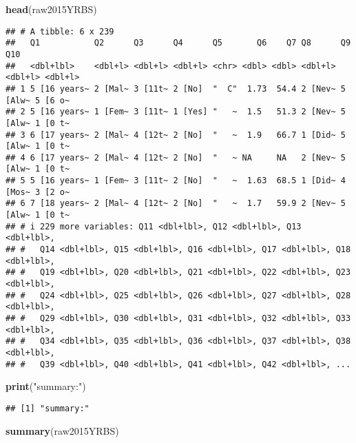 \documentclass[
]{article}
\newenvironment{Shaded}{\begin{snugshade}}{\end{snugshade}}
\newcommand{\FunctionTok}[1]{\textcolor[rgb]{0.13,0.29,0.53}{\textbf{#1}}}
\newcommand{\NormalTok}[1]{#1}
\newcommand{\StringTok}[1]{\textcolor[rgb]{0.31,0.60,0.02}{#1}}
\begin{document}
\begin{Shaded}
\begin{Highlighting}[]
\FunctionTok{head}\NormalTok{(raw2015YRBS)}
\end{Highlighting}
\end{Shaded}

\begin{verbatim}
## # A tibble: 6 x 239
##   Q1           Q2      Q3      Q4      Q5       Q6    Q7 Q8      Q9      Q10    
##   <dbl+lbl>    <dbl+l> <dbl+l> <dbl+l> <chr> <dbl> <dbl> <dbl+l> <dbl+l> <dbl+l>
## 1 5 [16 years~ 2 [Mal~ 3 [11t~ 2 [No]  "  C"  1.73  54.4 2 [Nev~ 5 [Alw~ 5 [6 o~
## 2 5 [16 years~ 1 [Fem~ 3 [11t~ 1 [Yes] "   ~  1.5   51.3 2 [Nev~ 5 [Alw~ 1 [0 t~
## 3 6 [17 years~ 2 [Mal~ 4 [12t~ 2 [No]  "   ~  1.9   66.7 1 [Did~ 5 [Alw~ 1 [0 t~
## 4 6 [17 years~ 2 [Mal~ 4 [12t~ 2 [No]  "   ~ NA     NA   2 [Nev~ 5 [Alw~ 1 [0 t~
## 5 5 [16 years~ 1 [Fem~ 3 [11t~ 2 [No]  "   ~  1.63  68.5 1 [Did~ 4 [Mos~ 3 [2 o~
## 6 7 [18 years~ 2 [Mal~ 4 [12t~ 2 [No]  "   ~  1.7   59.9 2 [Nev~ 5 [Alw~ 1 [0 t~
## # i 229 more variables: Q11 <dbl+lbl>, Q12 <dbl+lbl>, Q13 <dbl+lbl>,
## #   Q14 <dbl+lbl>, Q15 <dbl+lbl>, Q16 <dbl+lbl>, Q17 <dbl+lbl>, Q18 <dbl+lbl>,
## #   Q19 <dbl+lbl>, Q20 <dbl+lbl>, Q21 <dbl+lbl>, Q22 <dbl+lbl>, Q23 <dbl+lbl>,
## #   Q24 <dbl+lbl>, Q25 <dbl+lbl>, Q26 <dbl+lbl>, Q27 <dbl+lbl>, Q28 <dbl+lbl>,
## #   Q29 <dbl+lbl>, Q30 <dbl+lbl>, Q31 <dbl+lbl>, Q32 <dbl+lbl>, Q33 <dbl+lbl>,
## #   Q34 <dbl+lbl>, Q35 <dbl+lbl>, Q36 <dbl+lbl>, Q37 <dbl+lbl>, Q38 <dbl+lbl>,
## #   Q39 <dbl+lbl>, Q40 <dbl+lbl>, Q41 <dbl+lbl>, Q42 <dbl+lbl>, ...
\end{verbatim}

\begin{Shaded}
\begin{Highlighting}[]
\FunctionTok{print}\NormalTok{(}\StringTok{"summary:"}\NormalTok{)}
\end{Highlighting}
\end{Shaded}

\begin{verbatim}
## [1] "summary:"
\end{verbatim}

\begin{Shaded}
\begin{Highlighting}[]
\FunctionTok{summary}\NormalTok{(raw2015YRBS)}
\end{Highlighting}
\end{Shaded}
\end{document}
